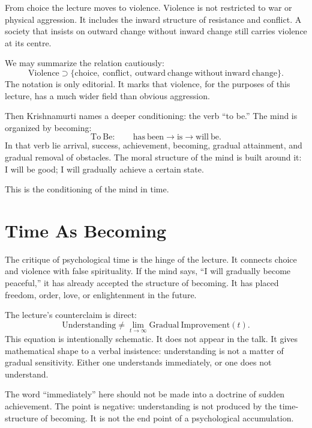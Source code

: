 From choice the lecture moves to violence. Violence is not restricted to war or physical aggression. It includes the inward structure of resistance and conflict. A society that insists on outward change without inward change still carries violence at its centre.

We may summarize the relation cautiously:
\begin{equation}
\mathrm{Violence} \supset
\{\mathrm{choice},\ \mathrm{conflict},\ \mathrm{outward\ change\ without\ inward\ change}\}.
\end{equation}
The notation is only editorial. It marks that violence, for the purposes of this lecture, has a much wider field than obvious aggression.

Then Krishnamurti names a deeper conditioning: the verb ``to be.'' The mind is organized by becoming:
\begin{equation}
\mathrm{To\ Be}:\qquad
\mathrm{has\ been} \longrightarrow \mathrm{is} \longrightarrow \mathrm{will\ be}.
\end{equation}
In that verb lie arrival, success, achievement, becoming, gradual attainment, and gradual removal of obstacles. The moral structure of the mind is built around it: I will be good; I will gradually achieve a certain state.

This is the conditioning of the mind in time.

\section{Time As Becoming}

The critique of psychological time is the hinge of the lecture. It connects choice and violence with false spirituality. If the mind says, ``I will gradually become peaceful,'' it has already accepted the structure of becoming. It has placed freedom, order, love, or enlightenment in the future.

The lecture's counterclaim is direct:
\begin{equation}
\mathrm{Understanding} \neq
\lim_{t\to\infty}\mathrm{Gradual\ Improvement}(t).
\end{equation}
This equation is intentionally schematic. It does not appear in the talk. It gives mathematical shape to a verbal insistence: understanding is not a matter of gradual sensitivity. Either one understands immediately, or one does not understand.

\begin{remark}
The word ``immediately'' here should not be made into a doctrine of sudden achievement. The point is negative: understanding is not produced by the time-structure of becoming. It is not the end point of a psychological accumulation.
\end{remark}

